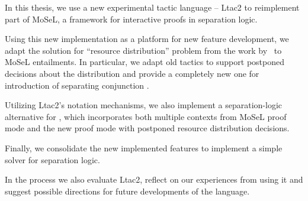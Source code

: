 In this thesis, we use a new experimental tactic language -- Ltac2 to reimplement part of MoSeL, a framework for interactive proofs in separation logic.

Using this new implementation as a platform for new feature development, we adapt the solution for ``resource distribution'' problem from the work by~\citet{harlandResourceDistributionBooleanConstraints2003} to MoSeL entailments. In particular, we adapt old tactics to support postponed decisions about the distribution and provide a completely new one for introduction of separating conjunction .

Utilizing Ltac2's notation mechanisms, we also implement a separation-logic alternative for , which incorporates both multiple contexts from MoSeL proof mode and the new proof mode with postponed resource distribution decisions.

Finally, we consolidate the new implemented features to implement a simple solver for separation logic.

In the process we also evaluate Ltac2, reflect on our experiences from using it and suggest possible directions for future developments of the language.


